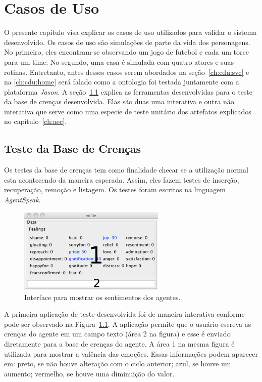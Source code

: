 \chapter{Casos de Uso} \label{ch:cdu}

O presente capítulo visa explicar os casos de uso utilizados para validar o
sistema desenvolvido. Os casos de uso são simulações de parte da vida dos
personagens. No primeiro, eles encontram-se observando um jogo de futebol e
cada um torce para um time. No segundo, uma casa é simulada com quatro atores
e suas rotinas. Entretanto, antes desses casos serem abordados na
seção~\ref{ch:cdu:svc} e na \ref{ch:cdu:home}
será falado como a ontologia foi testada juntamente com a plataforma
\emph{Jason}. A seção~\ref{ch:cdu:tbc} explica as ferramentas desenvolvidas
para o teste da base de crenças desenvolvida. Elas são duas
uma interativa e outra não interativa que serve como uma especie de teste
unitário dos artefatos explicados no capítulo~\ref{ch:aec}.

\section{Teste da Base de Crenças} \label{ch:cdu:tbc}

Os testes da base de crenças tem como finalidade checar se a utilização normal
esta acontecendo da maneira esperada. Assim, eles fazem testes de inserção,
recuperação, remoção e listagem. Os testes foram escritos na linguagem
\emph{AgentSpeak}.

\begin{figure}
	\begin{center}
		\includegraphics[width=70mm]{figuras/introductionDF.png}
	\end{center}
	\caption{Interface para mostrar os sentimentos dos agentes.}
	\label{fig:introducaoDF}
\end{figure}

A primeira aplicação de teste desenvolvida foi de maneira interativa conforme
pode ser observado na Figura~\ref{fig:introducaoDF}. A aplicação permite que o
usuário escreva as crenças do agente em um campo texto (área 2 na figura) e
esse é enviado diretamente para a base de crenças do agente. A área 1 na mesma
figura é utilizada para mostrar a valência das emoções.
Essas informações podem aparecer em: preto, se não houve alteração com o ciclo
anterior; azul, se houve um aumento; vermelho, se houve uma diminuição do
valor.

